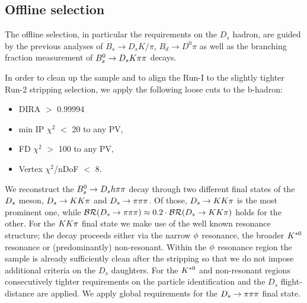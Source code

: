 \subsection{Offline selection}

The offline selection, in particular the requirements on the $D_s$ hadron, are guided by the previous analyses of 
$B_s \to D_s K/\pi$, $B_d \to D^0 \pi$ as well as the branching fraction measurement of ${{B}^0_{s}}\rightarrow{\ensuremath{{D}_{s}}}{\ensuremath{K}}{\ensuremath{\pi}}{\ensuremath{\pi}}$ decays.

In order to clean up the sample and to align the Run-I to the slightly tighter Run-2 stripping selection, we apply the following loose cuts to the b-hadron:
\begin{itemize}
\item DIRA $>$ 0.99994
\item min IP $\chi^{2}$ $<$ 20 to any PV,
\item FD $\chi^{2}$ $>$ 100 to any PV,
\item Vertex $\chi^{2}$/nDoF $<$ 8.
\end{itemize}    
We reconstruct the ${{B}^0_{s}}\rightarrow{\ensuremath{{D}_{s}}} h{\pi}{\pi}$ decay through two different final states of the ${{D}_{s}}$ meson, ${{D}_{s}}\rightarrow{\ensuremath{K}}{\ensuremath{K}}{\ensuremath{\pi}}$ and ${{D}_{s}}\rightarrow{\ensuremath{\pi}}{\ensuremath{\pi}}{\ensuremath{\pi}}$.
Of those, ${{D}_{s}}\rightarrow{\ensuremath{K}}{\ensuremath{K}}{\ensuremath{\pi}}$ is the most prominent one,
while $\mathcal{BR}({{D}_{s}}\rightarrow{\ensuremath{\pi}}{\ensuremath{\pi}}{\ensuremath{\pi}}) \approx 0.2\cdot\mathcal{BR}({{D}_{s}}\rightarrow{\ensuremath{K}}{\ensuremath{K}}{\ensuremath{\pi}})$ holds for the other. 
For the ${K}{K}{\pi}$  final state we make use of the well known resonance structure;
the decay proceeds either via the narrow $\phi$ resonance, the broader ${{K}^{*0}}$ resonance or (predominantly) non-resonant.
Within the $\phi$ resonance region the sample is already sufficiently clean after the stripping so that we do not impose additional criteria on the $D_s$ daughters.
For the ${{K}^{*0}}$ and non-resonant regions consecutively tighter requirements on the particle identification and the $D_s$ flight-distance are applied. 
We apply global requirements for the ${{D}_{s}}\rightarrow{\ensuremath{\pi}}{\ensuremath{\pi}}{\ensuremath{\pi}}$ final state.




